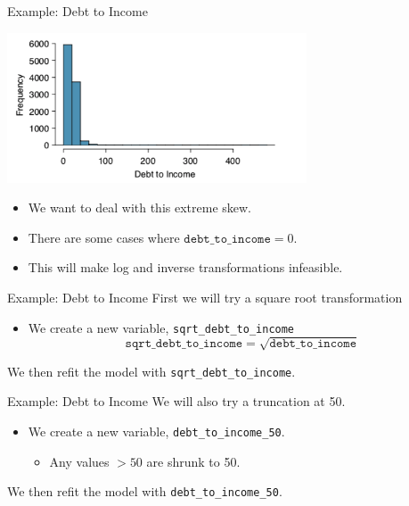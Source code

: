 \begin{frame}{Example: Debt to Income}
    \begin{center}
        \includegraphics[width=3.5in]{images/debtincomehist.png}
    \end{center}
    \begin{itemize}
        \item We want to deal with this extreme skew.
        \item There are some cases where $\texttt{debt\_to\_income}=0$.
        \item This will make log and inverse transformations infeasible.
    \end{itemize}
\end{frame}

\begin{frame}{Example: Debt to Income}
    First we will try a square root transformation
    \begin{itemize}
        \item We create a new variable, \texttt{sqrt\_debt\_to\_income}
        \[
            \texttt{sqrt\_debt\_to\_income} = \sqrt{\texttt{debt\_to\_income}}
        \]
    \end{itemize}
    We then refit the model with \texttt{sqrt\_debt\_to\_income}.
\end{frame}

\begin{frame}{Example: Debt to Income}
    We will also try a truncation at 50.
    \begin{itemize}
        \item We create a new variable, \texttt{debt\_to\_income\_50}.
        \begin{itemize}
            \item Any values $>50$ are shrunk to 50.
        \end{itemize}
    \end{itemize}
    We then refit the model with \texttt{debt\_to\_income\_50}.
\end{frame}

